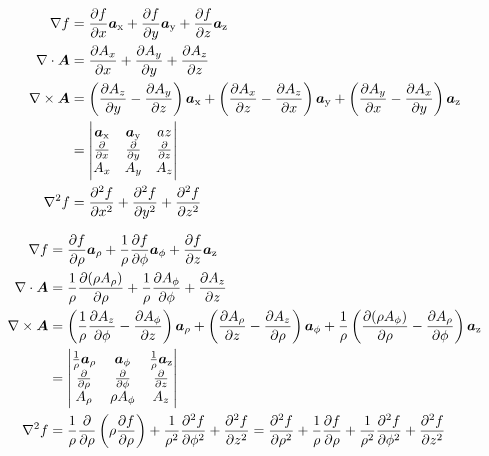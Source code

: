 
\begin{align*}
\nabla f&=\frac{\partial f}{\partial x}{\boldsymbol{a}}_{\textup{x}}+\frac{\partial f}{\partial y}{\boldsymbol{a}}_{\textup{y}}+\frac{\partial f}{\partial z}{\boldsymbol{a}}_{\textup{z}}\\
\nabla \cdot {\ensuremath{{\boldsymbol{A}}}}&=\frac{\partial A_x}{\partial x}+\frac{\partial A_y}{\partial y}+\frac{\partial A_z}{\partial z}\\
\nabla \times {\ensuremath{{\boldsymbol{A}}}}&=\left(\frac{\partial A_z}{\partial y}-\frac{\partial A_y}{\partial z} \right){\boldsymbol{a}}_{\textup{x}}+\left(\frac{\partial A_x}{\partial z}-\frac{\partial A_z}{\partial x} \right){\boldsymbol{a}}_{\textup{y}}+\left(\frac{\partial A_y}{\partial x}-\frac{\partial A_x}{\partial y} \right){\boldsymbol{a}}_{\textup{z}}\\
&=\begin{vmatrix}  {\boldsymbol{a}}_{\textup{x}} & {\boldsymbol{a}}_{\textup{y}} & az\\ \frac{\partial}{\partial x}& \frac{\partial }{\partial y} & \frac{\partial }{\partial z}\\ A_x & A_y & A_z \end{vmatrix}\\
\nabla^2 f &=\frac{\partial^2 f}{\partial x^2}+\frac{\partial^2 f}{\partial y^2}+\frac{\partial^2 f}{\partial z^2}
\end{align*}


\begin{align*}
\nabla f &=\frac{\partial f}{\partial \rho}{\boldsymbol{a}}_{\rho}+\frac{1}{\rho}\frac{\partial f}{\partial \phi}{\boldsymbol{a}}_{\phi}+\frac{\partial f}{\partial z}{\boldsymbol{a}}_{\textup{z}}\\
\nabla \cdot {\ensuremath{{\boldsymbol{A}}}}&=\frac{1}{\rho}\frac{\partial (\rho A_{\rho})}{\partial \rho}+\frac{1}{\rho}\frac{\partial A_{\phi}}{\partial \phi}+\frac{\partial A_z}{\partial z}\\
\nabla \times {\ensuremath{{\boldsymbol{A}}}}&=\left(\frac{1}{\rho}\frac{\partial A_z}{\partial \phi}-\frac{\partial A_{\phi}}{\partial z} \right){\boldsymbol{a}}_{\rho}+\left(\frac{\partial A_{\rho}}{\partial z}-\frac{\partial A_z}{\partial \rho} \right){\boldsymbol{a}}_{\phi}+\frac{1}{\rho}\left(\frac{\partial (\rho A_{\phi})}{\partial \rho}-\frac{\partial A_{\rho}}{\partial \phi} \right){\boldsymbol{a}}_{\textup{z}} \\
&=\begin{vmatrix}\frac{1}{\rho}{\boldsymbol{a}}_{\rho} & {\boldsymbol{a}}_{\phi} & \frac{1}{\rho} {\boldsymbol{a}}_{\textup{z}} \\ \frac{\partial}{\partial\rho} & \frac{\partial}{\partial \phi} & \frac{\partial}{\partial z}\\ A_{\rho} & \rho A_{\phi} & A_z \end{vmatrix}\\
\nabla^2 f &=\frac{1}{\rho}\frac{\partial}{\partial \rho}\left(\rho \frac{\partial f}{\partial \rho} \right)+\frac{1}{\rho^2}\frac{\partial^2 f}{\partial \phi^2}+\frac{\partial^2  f}{\partial z^2}=\frac{\partial^2 f}{\partial \rho^2}+\frac{1}{\rho}\frac{\partial f}{\partial \rho}+\frac{1}{\rho^2}\frac{\partial^2 f}{\partial \phi^2}+\frac{\partial^2 f}{\partial z^2}
\end{align*}



